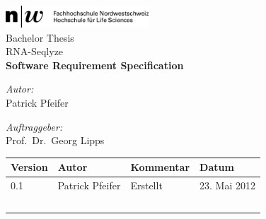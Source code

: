 \begin{titlepage}
\begin{center}
%
\includegraphics[width=0.4\textwidth]{../../assets/fhnw-logo}
\\[1cm]
{ \large Bachelor Thesis }
%
\\[1cm]
{ \Huge RNA-Seqlyze }
\\[1cm]
{ \huge \bfseries Software Requirement Specification }
\\[2cm]
%
\begin{minipage}{0.4\textwidth}
\begin{flushleft}
\large\emph{Autor:}\\
	Patrick Pfeifer\\
\end{flushleft}
\end{minipage}
%
\begin{minipage}{0.4\textwidth}
\begin{flushright}
\large\emph{Auftraggeber:}\\
	Prof.~Dr.~Georg Lipps
\end{flushright}
\end{minipage}
%
\vfill
%
\listoftodos\vfill
%
\setlength{\aboverulesep}{0pt}
\setlength{\belowrulesep}{0pt}
\setlength{\extrarowheight}{.75ex}
\begin{tabularx}{\textwidth}{|p{1.2cm}|>{\raggedright}X|X|p{3cm}|}
\rowcolor[gray]{0.8}
	Version & Autor & Kommentar & Datum\\
\midrule
	  0.1
	& Patrick Pfeifer
	& Erstellt
	& 23. Mai 2012
\\
	  \ 
	& \ 
	& \ 
	& \ 
\\
\bottomrule
\end{tabularx}
\end{center}
\end{titlepage}

